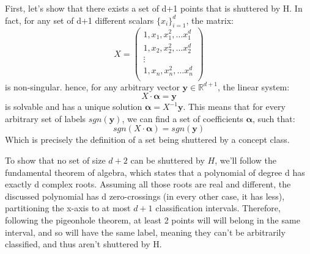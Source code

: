 First, let's show that there exists a set of d+1 points that is shuttered by H. 
In fact, for any set of d+1 different scalars $\{x_i\}_{i=1}^d$, the matrix:
\begin{equation*}
    X = \begin{pmatrix}
        1, x_1, x_1^2, \dotsc  x_1^d \\
        1, x_2, x_2^2, \dotsc  x_2^d \\
        \vdots \\
        1, x_n, x_n^2, \dotsc  x_n^d \\
    \end{pmatrix}
\end{equation*}
is non-singular. hence, for any arbitrary vector $\boldsymbol{y} \in \mathbb{R}^{d+1}$, the linear system:
\begin{equation*}
    X \cdot \boldsymbol{\alpha} = \boldsymbol{y}
\end{equation*}
is solvable and has a unique solution $\boldsymbol{\alpha} = X^{-1}\boldsymbol{y}$. This means that for every arbitrary set of labels $sgn(\boldsymbol{y})$, we can find a set of coefficients $\boldsymbol{\alpha}$, such that:
\begin{equation*}
    sgn(X \cdot \boldsymbol{\alpha}) = sgn(\boldsymbol{y})
\end{equation*}
Which is precisely the definition of a set being shuttered by a concept class.

To show that no set of size $d+2$ can be shuttered by $H$, we'll follow the fundamental theorem of algebra, which states that a polynomial of degree d has exactly d complex roots. Assuming all those roots are real and different, the discussed polynomial has d zero-crossings (in every other case, it has less), partitioning the x-axis to at most $d+1$ classification intervals. Therefore, following the pigeonhole theorem, at least 2 points will will belong in the same interval, and so will have the same label, meaning they can't be arbitrarily classified, and thus aren't shuttered by H.
